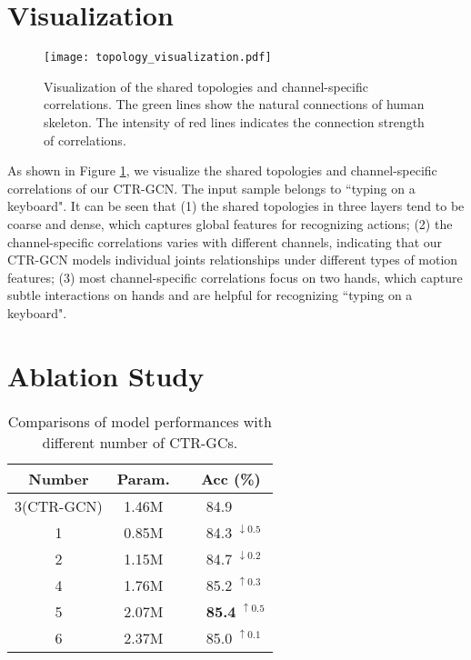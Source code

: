 \documentclass[10pt,twocolumn,letterpaper]{article}
\begin{document}
\section*{Visualization}
\begin{figure}[t]
	\centering
	\texttt{[image: topology\_visualization.pdf]} \caption{Visualization of the shared topologies and channel-specific correlations. The green lines show the natural connections of human skeleton. The intensity of red lines indicates the connection strength of correlations.}
	\label{fig:visualize}
\end{figure}

As shown in Figure \ref{fig:visualize}, we visualize the shared topologies and channel-specific correlations of our CTR-GCN. The input sample belongs to ``typing on a keyboard". It can be seen that (1) the shared topologies in three layers tend to be coarse and dense, which captures global features for recognizing actions; (2) the channel-specific correlations varies with different channels, indicating that our CTR-GCN models individual joints relationships under different types of motion features; (3) most channel-specific correlations focus on two hands, which capture subtle interactions on hands and are helpful for recognizing ``typing on a keyboard".

\section*{Ablation Study}
\begin{table}
	\begin{center}
		\begin{tabular}{c c l}
			\hline
			\textbf{Number} & \textbf{Param.} & \ \ \textbf{Acc (\%)} \\
			\hline\hline
			3(CTR-GCN) & 1.46M & \ \ \ 84.9 \\
			\hline
			1 & 0.85M & \ \ \ 84.3 $^{\downarrow 0.5}$\\
			2 & 1.15M & \ \ \ 84.7 $^{\downarrow 0.2}$\\
			4 & 1.76M & \ \ \ 85.2 $^{\uparrow 0.3}$ \\
			5 & 2.07M & \ \ \ \textbf{85.4} $^{\mathbf{\uparrow 0.5}}$\\
			6 & 2.37M & \ \ \ 85.0 $^{\uparrow 0.1}$ \\
			\hline
		\end{tabular}
	\end{center}
	\caption{Comparisons of model performances with different number of CTR-GCs.}
	\label{tab:num_ctrgcs}
\end{table}
\end{document}
